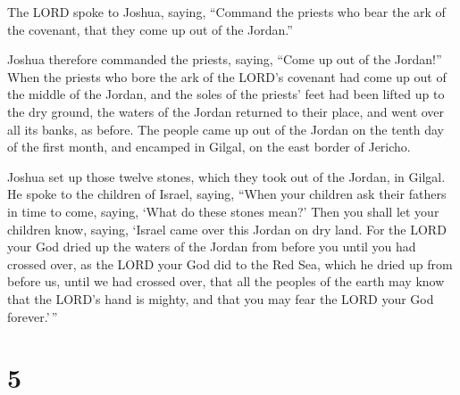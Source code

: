  The LORD spoke to Joshua, saying, 
``Command the priests who bear the ark of the covenant, that they come
up out of the Jordan.''

 Joshua therefore commanded the priests, saying, ``Come
up out of the Jordan!''  When the priests who bore the
ark of the LORD's covenant had come up out of the middle of the Jordan,
and the soles of the priests' feet had been lifted up to the dry ground,
the waters of the Jordan returned to their place, and went over all its
banks, as before.  The people came up out of the Jordan
on the tenth day of the first month, and encamped in Gilgal, on the east
border of Jericho.

 Joshua set up those twelve stones, which they took out
of the Jordan, in Gilgal.  He spoke to the children of
Israel, saying, ``When your children ask their fathers in time to come,
saying, `What do these stones mean?'  Then you shall let
your children know, saying, `Israel came over this Jordan on dry land.
 For the LORD your God dried up the waters of the Jordan
from before you until you had crossed over, as the LORD your God did to
the Red Sea, which he dried up from before us, until we had crossed
over,  that all the peoples of the earth may know that
the LORD's hand is mighty, and that you may fear the LORD your God
forever.'\,''

\hypertarget{section-4}{%
\section{5}\label{section-4}}

